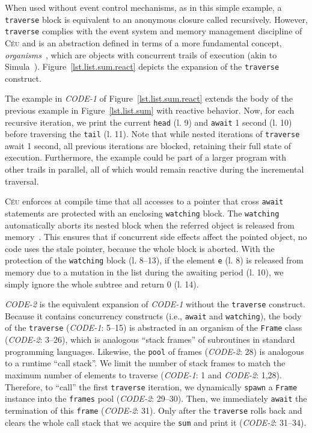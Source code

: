 \documentclass{sig-alternate}
\newcommand{\CEU}{\textsc{C\'{e}u}\xspace}
\newcommand{\code}[1] {{\small{\texttt{#1}}}}
\begin{document}
When used without event control mechanisms, as in this simple example, a 
\code{traverse} block is equivalent to an anonymous closure called recursively.
%
However, \code{traverse} complies with the event system and memory management 
discipline of \CEU and is an abstraction defined in terms of a more fundamental 
concept, \emph{organisms}~\cite{ceu.mod15}, which are objects with concurrent 
trails of execution (akin to Simula~\cite{simula}).
%
Figure~\ref{lst.list.sum.react} depicts the expansion of the \code{traverse} 
construct.

The example in \emph{CODE-1} of Figure~\ref{lst.list.sum.react} extends the 
body of the previous example in Figure~\ref{lst.list.sum} with reactive 
behavior.
%
Now, for each recursive iteration, we print the current \code{head} (l. 9) 
and \code{await} 1 second (l. 10) before traversing the \code{tail} (l. 
11).
%
Note that while nested iterations of \code{traverse} await 1 second, all 
previous iterations are blocked, retaining their full state of execution.
Furthermore, the example could be part of a larger program with other trails in 
parallel, all of which would remain reactive during the incremental traversal.

\CEU enforces at compile time that all accesses to a pointer that cross 
\code{await} statements are protected with an enclosing \code{watching} block.
%
The \code{watching} automatically aborts its nested block when the referred 
object is released from memory~\cite{ceu.mod15}.
%
This ensures that if concurrent side effects affect the pointed object, no code 
uses the stale pointer, because the whole block is aborted.
%
With the protection of the \code{watching} block (l. 8--13), if the element 
\code{e} (l. 8) is released from memory due to a mutation in the list during 
the awaiting period (l. 10), we simply ignore the whole subtree and return 0 
(l. 14).

\emph{CODE-2} is the equivalent expansion of \emph{CODE-1} without the 
\code{traverse} construct.
%
Because it contains concurrency constructs (i.e., \code{await} and 
\code{watching}), the body of the \code{traverse} (\emph{CODE-1}: 5--15) is 
abstracted in an organism of the \code{Frame} class (\emph{CODE-2}: 3--26), 
which is analogous ``stack frames'' of subroutines in standard programming 
languages.
Likewise, the \code{pool} of frames (\emph{CODE-2}: 28) is analogous to a 
runtime ``call stack''.
We limit the number of stack frames to match the maximum number of elements to 
traverse (\emph{CODE-1}: 1 and \emph{CODE-2}: 1,28).
Therefore, to ``call'' the first \code{traverse} iteration, we dynamically 
\code{spawn} a \code{Frame} instance into the \code{frames} pool 
(\emph{CODE-2}: 29--30).
Then, we immediately \code{await} the termination of this \code{frame} 
(\emph{CODE-2}: 31).
Only after the \code{traverse} rolls back and clears the whole call stack
that we acquire the \code{sum} and print it (\emph{CODE-2}: 31--34).
\end{document}
